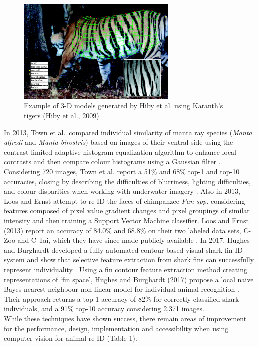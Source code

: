 \documentclass[11pt]{article}
\begin{document}
\begin{figure}
  \begin{flushright}
    \includegraphics[width=3in]{3DTiger.jpg}
  \end{flushright}
  \caption{Example of 3-D models generated by Hiby et al. using Karanth's tigers (Hiby et al., 2009)}
\end{figure}

\noindent
In 2013, Town et al.\ compared individual similarity of manta ray species (\textit{Manta alfredi} and \textit{Manta birostris}) based on images of their ventral side using the contrast-limited adaptive histogram equalization algorithm to enhance local contrasts and then compare colour histograms using a Gaussian filter \cite{town2013manta}. Considering 720 images, Town et al. report a 51\% and 68\% top-1 and top-10 accuracies, closing by describing the difficulties of blurriness, lighting difficulties, and colour disparities when working with underwater imagery \cite{town2013manta}. Also in 2013, Loos and Ernst attempt to re-ID the faces of chimpanzee \textit{Pan spp.} considering features composed of pixel value gradient changes and pixel groupings of similar intensity and then training a Support Vector Machine classifier. Loos and Ernst (2013) report an accuracy of 84.0\% and 68.8\% on their two labeled data sets, C-Zoo and C-Tai, which they have since made publicly available \cite{loos2013automated}. In 2017, Hughes and Burghardt developed a fully automated contour-based visual shark fin ID system and show that selective feature extraction from shark fins can successfully represent individuality \cite{hughes2017automated}. Using a fin contour feature extraction method creating representations of `fin space', Hughes and Burghardt (2017) propose a local naive Bayes nearest neighbour non-linear model for individual animal recognition \cite{hughes2017automated}. Their approach returns a top-1 accuracy of 82\% for correctly classified shark individuals, and a 91\% top-10 accuracy considering 2,371 images.
\newline
\\
While these techniques have shown success, there remain areas of improvement for the performance, design, implementation and accessibility when using computer vision for animal re-ID (Table 1). 
\end{document}
